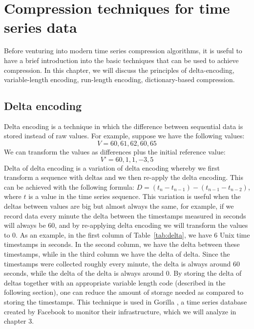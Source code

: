 
\chapter{Compression techniques for time series data}
Before venturing into modern time series compression algorithms, it is useful to have a brief
introduction into the basic techniques that can be used to achieve compression. In this chapter,
we will discuss the principles of delta-encoding, variable-length encoding, run-length encoding,
dictionary-based compression.

\section{Delta encoding}
Delta encoding is a technique in which the difference between sequential data is stored instead
of raw values. For example, suppose we have the following values:
$$V= 60, 61, 62, 60, 65$$
We can transform the values as differences plus the initial reference value:
$$V’= 60, 1, 1, -3, 5$$
Delta of delta encoding is a variation of delta encoding whereby we first transform a sequence
with deltas and we then re-apply the delta encoding. This can be achieved with the following
formula: $D = (t_{n} - t_{n-1}) - (t_{n-1} - t_{n-2})$, where $t$ is a value in the time series
sequence. This variation is useful when the deltas between values are big but almost always
the same, for example, if we record data every minute the delta between the timestamps measured
in seconds will always be 60, and by re-applying delta encoding we will transform the values
to 0. As an example, in the first column of Table~\ref{tab:delta}, we have 6 Unix time timestamps
in seconds. In the second column, we have the delta between these timestamps, while in the
third column we have the delta of delta.
Since the timestamps were collected roughly every minute, the delta is always around 60 seconds,
while the delta of the delta is always around 0. By storing the delta of deltas together with
an appropriate variable length code (described in the following section), one can reduce the
amount of storage needed as compared to storing the timestamps.
This technique is used in Gorilla \cite{Pelkonen2015Gorilla}, a time series database created
by Facebook to monitor their infrastructure, which we will analyze in chapter 3.

